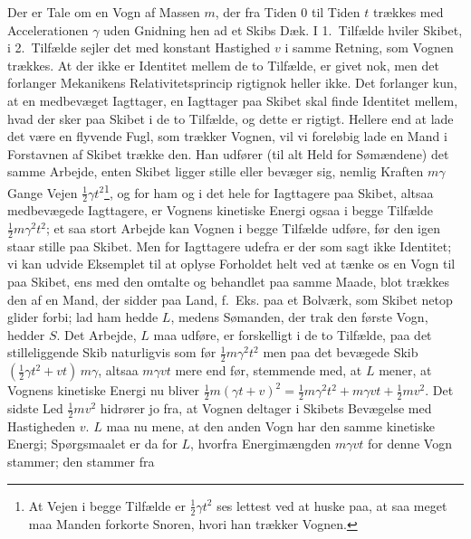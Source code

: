 \documentclass[12pt,a4paper]{article}
\newcommand{\opage}[1]{\marginnote{\footnotesize\textit{[#1]}}}
\begin{document}
Der er Tale om en Vogn af Massen $m$, der fra Tiden 0 til Tiden $t$
trækkes med Accelerationen $\gamma$ uden Gnidning hen ad et Skibs Dæk.
I 1.~Tilfælde hviler Skibet, i 2.~Tilfælde sejler det med konstant
Hastighed $v$ i samme Retning, som Vognen trækkes. At der ikke er
Identitet mellem de to Tilfælde, er givet nok, men det forlanger
Mekanikens Relativitetsprincip rigtignok heller ikke. Det forlanger
kun, at en medbevæget Iagttager, en Iagttager paa Skibet skal finde
Identitet mellem, hvad der sker paa Skibet i de to Tilfælde, og dette
er rigtigt. Hellere end at lade det være en flyvende Fugl, som trækker
Vognen, vil vi foreløbig lade en Mand i Forstavnen af Skibet trække
den. Han udfører (til alt Held for Sømændene) det samme Arbejde, enten
Skibet ligger stille eller bevæger sig, nemlig Kraften $m\gamma$ Gange
Vejen $\tfrac{1}{2}\gamma t^{2}$\footnote{At Vejen i begge Tilfælde er
$\tfrac{1}{2}\gamma t^{2}$ ses lettest ved at huske paa, at saa meget
maa Manden forkorte Snoren, hvori han trækker Vognen.}, og for ham og i
det hele for Iagttagere paa Skibet, altsaa medbevægede Iagttagere, er
Vognens kinetiske Energi ogsaa i begge Tilfælde
$\tfrac{1}{2}m\gamma^{2}t^{2}$; et saa stort Arbejde kan Vognen i begge
Tilfælde udføre, før den igen staar stille paa Skibet. Men for
Iagttagere udefra er der som sagt ikke Identitet; vi kan udvide
Eksemplet til at oplyse Forholdet helt ved at tænke os en Vogn til paa
Skibet, ens med den omtalte og behandlet paa samme Maade, blot trækkes
den af en Mand, der sidder paa Land, f.~Eks. paa et Bolværk, som Skibet
netop glider forbi; lad ham hedde $L$, medens Sømanden, der trak den
første Vogn, hedder $S$. Det Arbejde, $L$ maa udføre, er forskelligt i
de to Tilfælde, paa det stilleliggende Skib naturligvis som før
$\tfrac{1}{2}m\gamma^{2}t^{2}$ men paa det bevægede Skib
$(\tfrac{1}{2}\gamma t^{2}+vt)\,m\gamma$, altsaa $m\gamma vt$ mere end
før, stemmende med, at $L$ mener, at Vognens kinetiske Energi nu bliver
$\tfrac{1}{2}m(\gamma t+v)^{2}=\tfrac{1}{2}m\gamma^{2}t^{2}+m\gamma
vt+\tfrac{1}{2}mv^{2}$. Det sidste Led $\tfrac{1}{2}mv^{2}$ hidrører jo
fra, at Vognen deltager i Skibets Bevægelse med Hastigheden $v$. $L$
maa nu mene, at den anden Vogn har den
\opage{28} %
samme kinetiske Energi; Spørgsmaalet er da for $L$, hvorfra
Energimængden $m\gamma vt$ for denne Vogn stammer; den stammer fra
\end{document}
